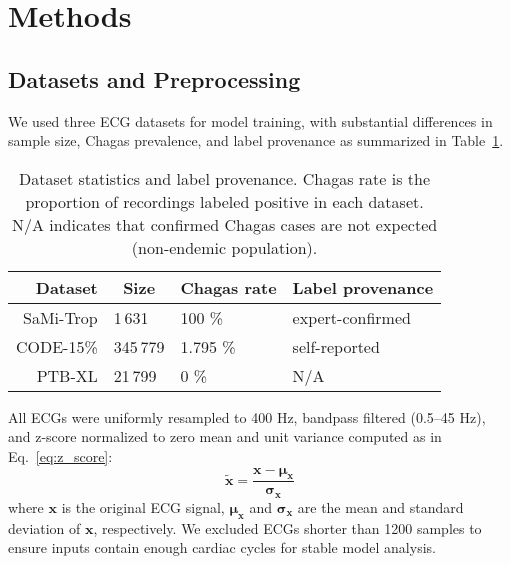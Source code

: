 \documentclass[twocolumn]{cinc}
\begin{document}
\section{Methods}
\label{sec:methods}


\subsection{Datasets and Preprocessing}
\label{subsec:data}


We used three ECG datasets for model training, with substantial differences in sample size, Chagas prevalence, and label provenance as summarized in Table~\ref{tab:dataset_stats}.

\setlength{\tabcolsep}{4pt} %
\begin{table}[!htp]
\centering
\begin{tabular}{rlll}
\toprule
Dataset & \multicolumn{1}{c}{Size} & \multicolumn{1}{c}{Chagas rate} & Label provenance \\
\midrule
SaMi-Trop   & 1\,631     & 100 \%    & expert-confirmed \\
CODE-15\%   & 345\,779   & 1.795 \%  & self-reported \\
PTB-XL      & 21\,799    & 0 \%      & N/A \\
\bottomrule
\end{tabular}
\caption{Dataset statistics and label provenance. Chagas rate is the proportion of recordings labeled positive in each dataset. N/A indicates that confirmed Chagas cases are not expected (non-endemic population).}
\label{tab:dataset_stats}
\end{table}
\setlength{\tabcolsep}{6pt} %

All ECGs were uniformly resampled to 400 Hz, bandpass filtered (0.5–45 Hz), and z-score normalized to zero mean and unit variance computed as in Eq.~\ref{eq:z_score}:
\begin{equation}
\label{eq:z_score}
\tilde{\mathbf{x}} = \frac{\mathbf{x} - \boldsymbol{\mu}_{\mathbf{x}}}{\boldsymbol{\sigma}_{\mathbf{x}}}
\end{equation}
where $\mathbf{x}$ is the original ECG signal, $\boldsymbol{\mu}_{\mathbf{x}}$ and $\boldsymbol{\sigma}_{\mathbf{x}}$ are the mean and standard deviation of $\mathbf{x}$, respectively. We excluded ECGs shorter than 1200 samples to ensure inputs contain enough cardiac cycles for stable model analysis.
\end{document}
